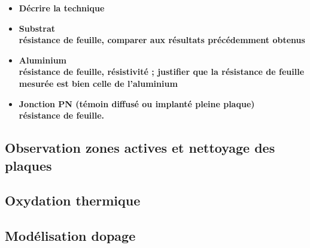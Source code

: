 \documentclass[11pt]{article}
\begin{document}
\begin{itemize}
\item \textbf{ D\'ecrire la technique  }
\item \textbf{ Substrat \\ 
   r\'esistance de feuille, comparer aux r\'esultats pr\'ec\'edemment obtenus}
\item \textbf{ Aluminium \\ 
r\'esistance de feuille, r\'esistivit\'e ; justifier que la r\'esistance de feuille mesur\'ee est bien celle de
     l'aluminium}
\item \textbf{Jonction PN (t\'emoin diffus\'e ou implant\'e pleine plaque) \\
    r\'esistance de feuille.}
\end{itemize}


\iffalse
\subsection{Capacit\'e -- r\'ealisation du di\'electrique}

\begin{itemize}

\item \textbf{Technique utilis\'ee, justifier}


\item \textbf{Profil de temp\'erature, expliquer le r\^ole des \'etapes-cl\'es}

\item \textbf{Calcul de l'\'epaisseur th\'eorique d'oxyde, comparer \`a la valeur mesur\'ee. Quelle est l'\'epaisseur de Si
        consomm\'e pour former cette couche de SiO2 ?}
\end{itemize}
\fi 


\iffalse

\subsection{Observation zones actives et nettoyage des plaques}

\subsection{Oxydation thermique}

\subsection{Mod\'elisation dopage}
\end{document}

